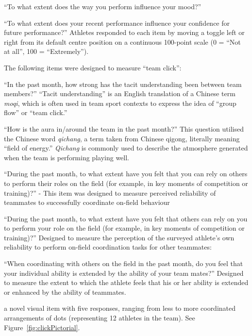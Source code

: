 \begin{CJK}{UTF8}{gbsn}
    \begin{description}[labelindent=1cm]
    \item[Performance On Mood] ``To what extent does the way you perform influence your mood?''
    \item [Performance Confidence Future] ``To what extent does your recent performance influence your confidence for future performance?''
    Athletes responded to each item by moving a toggle left or right from its default centre position on a continuous 100-point scale (0 = ``Not at all'', 100 = ``Extremely'').
    \end{description}


The following items were designed to measure ``team click'':
\begin{description}[labelindent=1cm]
  \item [Tacit Understanding:] ``In the past month, how strong has the tacit understanding been between team members?''  ``Tacit understanding'' is an English translation of a Chinese term \textit{moqi}, which is often used in team sport contexts to express the idea of  ``group flow'' or ``team click.''
  \item [Team Aura:] ``How is the aura in/around the team in the past month?'' This question utilised the Chinese word \textit{qichang}, a term taken from Chinese qigong, literally meaning ``field of energy.'' \textit{Qichang} is commonly used to describe the atmosphere generated when the team is performing playing well.
  \item [Reliability Of Others:] ``During the past month, to what extent have you felt that you can rely on others to perform their roles on the field (for example, in key moments of competition or training)?'' - This item was designed to measure perceived reliability of teammates to successfully coordinate  on-field behaviour
  \item [Reliability For Others:] ``During the past month, to what extent have you felt that others can rely on you to perform your role on the field (for example, in key moments of competition or training)?'' Designed to measure the perception of the surveyed athlete's own reliability to perform on-field coordination tasks for other teammates:
  \item[Ability Extended By Others:] ``When coordinating with others on the field in the past month, do you feel that your individual ability is extended by the ability of your team mates?'' Designed to measure the extent to which the athlete feels that his or her ability is extended or enhanced by the ability of teammates.
  \item [Click Pictorial:] a novel visual item with five responses, ranging from less to more coordinated arrangements of dots (representing 12 athletes in the team). See Figure~\ref{fig:clickPictorial}.
\end{description}


\end{CJK}
